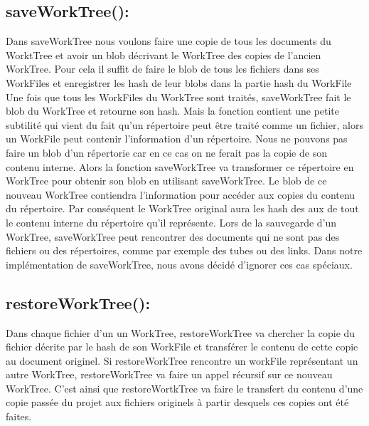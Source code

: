 \documentclass[12pt,francais]{article}
\begin{document}
\subsection{saveWorkTree():}
	Dans saveWorkTree nous voulons faire une copie de tous les documents du WorktTree et avoir un blob décrivant le WorkTree des copies de l'ancien WorkTree. Pour cela il suffit de faire le blob de tous les fichiers dans ses WorkFiles et enregistrer les hash de leur blobs dans la partie hash du WorkFile Une fois que tous les WorkFiles du WorkTree sont traités, saveWorkTree fait le blob du WorkTree et retourne son hash.
	 Mais la fonction contient une petite subtilité qui vient du fait qu'un répertoire peut être traité comme un fichier, alors un WorkFile peut contenir l'information d'un répertoire. Nous ne pouvons pas faire un blob d'un répertorie car en ce cas on ne ferait pas la copie de son contenu interne. Alors la fonction saveWorkTree va transformer ce répertoire en WorkTree pour obtenir son blob en utilisant saveWorkTree.  Le blob  de ce nouveau WorkTree contiendra l'information pour accéder aux copies du contenu du répertoire.
Par conséquent le WorkTree original aura les hash des aux de tout le contenu interne du répertoire qu'il représente.
	Lors de la sauvegarde d'un WorkTree, saveWorkTree peut rencontrer des documents qui ne sont pas des fichiers ou des répertoires, comme par exemple des tubes ou des links. Dans notre implémentation de saveWorkTree, nous avons décidé d'ignorer ces cas spéciaux.
	
\subsection{restoreWorkTree():} 
	Dans chaque fichier d'un un WorkTree, restoreWorkTree va chercher la copie du fichier décrite par le hash de son WorkFile et transférer le contenu de cette copie au document originel. Si restoreWorkTree rencontre un workFile représentant un autre WorkTree, restoreWorkTree va faire un appel récursif sur ce nouveau WorkTree. C'est ainsi que restoreWortkTree va faire le transfert du contenu d'une copie passée du projet aux fichiers originels à partir desquels ces copies ont été faites. 
\end{document}
